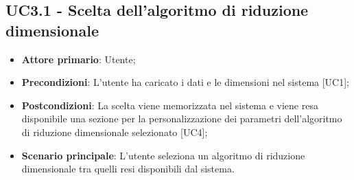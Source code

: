 \subsection{UC3.1 - Scelta dell'algoritmo di riduzione dimensionale}
\begin{itemize}
	\item \textbf{Attore primario}: Utente;
	\item \textbf{Precondizioni}: L'utente ha caricato i dati e le dimensioni nel sistema [UC1];
	\item \textbf{Postcondizioni}: La scelta viene memorizzata nel sistema e viene resa disponibile una sezione per la personalizzazione dei parametri dell'algoritmo di riduzione dimensionale selezionato [UC4];
	\item \textbf{Scenario principale}: L'utente seleziona un algoritmo di riduzione dimensionale tra quelli resi disponibili dal sistema.
\end{itemize}